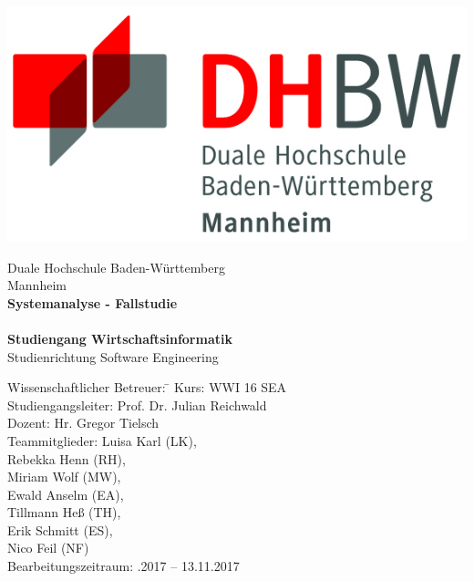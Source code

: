 \begin{titlepage}
\begin{minipage}{\textwidth}
		\vspace{-2cm}
		\noindent  
		\centering \includegraphics{img/logo.jpg}
\end{minipage}
\vspace{1em}
\sffamily
\begin{center}
	\textsf{\large{}Duale Hochschule Baden-W\"urttemberg\\[1.5mm] Mannheim}\\[2em]
	\textsf{\textbf{\Large{}Systemanalyse - Fallstudie}}\\[3mm]
	\textsf{\textbf{\DerTitelDerArbeit}} \\[1.5cm]
	\textsf{\textbf{\Large{}Studiengang Wirtschaftsinformatik}\\[3mm] \textsf{Studienrichtung Software Engineering}}
	
	\vspace{5em}

\begin{minipage}{\textwidth}

\begin{tabbing}
	Wissenschaftlicher Betreuer:
	\hspace{0.5cm}\=\kill
	Kurs: \> WWI 16 SEA \\[1.5mm]
	Studiengangsleiter: \> Prof. Dr. Julian Reichwald  \\[1.5mm]
	Dozent: \> Hr. Gregor Tielsch  \\[1.5mm]
	Teammitglieder: \> Luisa Karl (LK), \\ \> Rebekka Henn (RH), \\ \> Miriam Wolf (MW), \\ \> Ewald Anselm (EA), \\ \> Tillmann Heß (TH), \\ \> Erik Schmitt (ES), \\ \> Nico Feil (NF) \\[1.5mm]
	Bearbeitungszeitraum: .2017 -- 13.11.2017
\end{tabbing}
\end{minipage}

\end{center}

\end{titlepage}